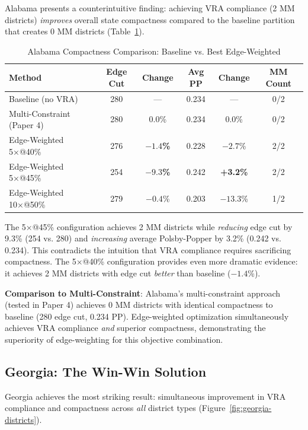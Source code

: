 Alabama presents a counterintuitive finding: achieving VRA compliance (2 MM districts) \emph{improves} overall state compactness compared to the baseline partition that creates 0 MM districts (Table~\ref{tab:alabama-detailed}).

\begin{table}[htbp]
\centering
\caption{Alabama Compactness Comparison: Baseline vs. Best Edge-Weighted}
\label{tab:alabama-detailed}
\begin{tabular}{lccccc}
\toprule
\textbf{Method} & \textbf{Edge Cut} & \textbf{Change} & \textbf{Avg PP} & \textbf{Change} & \textbf{MM Count} \\
\midrule
Baseline (no VRA)        & 280 & --- & 0.234 & --- & 0/2 \\
Multi-Constraint (Paper 4) & 280 & 0.0\% & 0.234 & 0.0\% & 0/2 \\
Edge-Weighted 5×@40\%    & 276 & \textbf{$-1.4$\%} & 0.228 & $-2.7$\% & 2/2 \\
Edge-Weighted 5×@45\%    & 254 & \textbf{$-9.3$\%} & 0.242 & \textbf{+3.2\%} & 2/2 \\
Edge-Weighted 10×@50\%   & 279 & $-0.4$\% & 0.203 & $-13.3$\% & 1/2 \\
\bottomrule
\end{tabular}
\end{table}

The 5×@45\% configuration achieves 2 MM districts while \emph{reducing} edge cut by 9.3\% (254 vs. 280) and \emph{increasing} average Polsby-Popper by 3.2\% (0.242 vs. 0.234). This contradicts the intuition that VRA compliance requires sacrificing compactness. The 5×@40\% configuration provides even more dramatic evidence: it achieves 2 MM districts with edge cut \emph{better} than baseline ($-1.4$\%).

\textbf{Comparison to Multi-Constraint}: Alabama's multi-constraint approach (tested in Paper 4) achieves 0 MM districts with identical compactness to baseline (280 edge cut, 0.234 PP). Edge-weighted optimization simultaneously achieves VRA compliance \emph{and} superior compactness, demonstrating the superiority of edge-weighting for this objective combination.

\subsection{Georgia: The Win-Win Solution}

Georgia achieves the most striking result: simultaneous improvement in VRA compliance and compactness across \emph{all} district types (Figure~\ref{fig:georgia-districts}).


